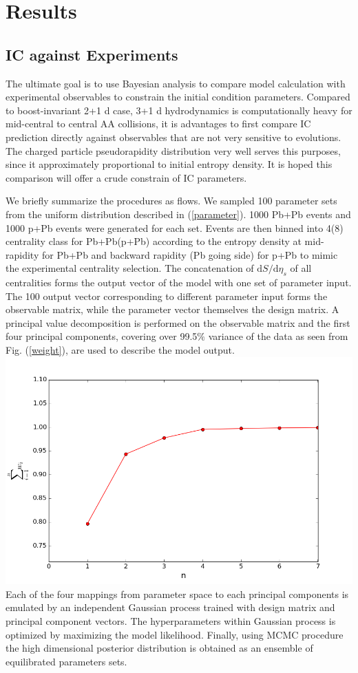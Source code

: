 \documentclass[aps,prl,twocolumn,groupedaddress]{revtex4-1}
\begin{document}
	
\section{Results}
	\subsection{IC against Experiments}
	The ultimate goal is to use Bayesian analysis to compare model calculation with experimental observables to constrain the initial condition parameters. 
	Compared to boost-invariant 2+1 d case, 3+1 d hydrodynamics is computationally heavy for mid-central to central AA collisions, it is advantages to first compare IC prediction directly against observables that are not very sensitive to evolutions. 
	The charged particle pseudorapidity distribution very well serves this purposes, since it approximately proportional to initial entropy density.
	It is hoped this comparison will offer a crude constrain of IC parameters.
	
	We briefly summarize the procedures as flows.
	We sampled 100 parameter sets from the uniform distribution described in (\ref{parameter}).
	1000 Pb+Pb events and 1000 p+Pb events were generated for each set.  
	Events are then binned into 4(8) centrality class for Pb+Pb(p+Pb) according to the entropy density at mid-rapidity for Pb+Pb and backward rapidity (Pb going side) for p+Pb to mimic the experimental centrality selection.
	The concatenation of $\mathrm{d}S/\mathrm{d}\eta_s$ of all centralities forms the output vector of the model with one set of parameter input. 
	The 100 output vector corresponding to different parameter input forms the observable matrix, while the parameter vector themselves the design matrix. 
	A principal value decomposition is performed on the observable matrix and the first four principal components, covering over 99.5$\%$ variance of the data as seen from Fig. (\ref{weight}), are used to describe the model output.
	\includegraphics[width=\columnwidth]{pics/weight.png}\label{weight}
	Each of the four mappings from parameter space to each principal components is emulated by an independent Gaussian process trained with design matrix and principal component vectors.
	The hyperparameters within Gaussian process is optimized by maximizing the model likelihood.
	Finally, using MCMC procedure the high dimensional posterior distribution is obtained as an ensemble of equilibrated parameters sets.
	
\end{document}
